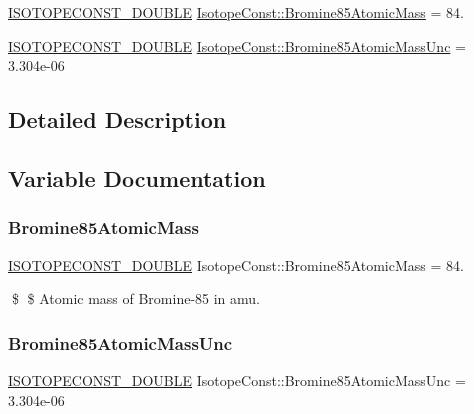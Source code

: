 \begin{DoxyCompactItemize}
\item 
\mbox{\hyperlink{group___isotope_const-_macros_ga8f45a7272ce02c0b4c65c44636ed719a}{I\+S\+O\+T\+O\+P\+E\+C\+O\+N\+S\+T\+\_\+\+D\+O\+U\+B\+LE}} \mbox{\hyperlink{group___isotope_const-_bromine-_br85_ga13665c09d7b5d3654af1a1f1cb1e62c3}{Isotope\+Const\+::\+Bromine85\+Atomic\+Mass}} = 84.
\item 
\mbox{\hyperlink{group___isotope_const-_macros_ga8f45a7272ce02c0b4c65c44636ed719a}{I\+S\+O\+T\+O\+P\+E\+C\+O\+N\+S\+T\+\_\+\+D\+O\+U\+B\+LE}} \mbox{\hyperlink{group___isotope_const-_bromine-_br85_ga22c033e37fce586beb32d6b892266d44}{Isotope\+Const\+::\+Bromine85\+Atomic\+Mass\+Unc}} = 3.\+304e-\/06
\end{DoxyCompactItemize}


\subsection{Detailed Description}


\subsection{Variable Documentation}
\mbox{\label{group___isotope_const-_bromine-_br85_ga13665c09d7b5d3654af1a1f1cb1e62c3}} 
\subsubsection{\texorpdfstring{Bromine85\+Atomic\+Mass}{Bromine85AtomicMass}}
{\footnotesize\ttfamily \mbox{\hyperlink{group___isotope_const-_macros_ga8f45a7272ce02c0b4c65c44636ed719a}{I\+S\+O\+T\+O\+P\+E\+C\+O\+N\+S\+T\+\_\+\+D\+O\+U\+B\+LE}} Isotope\+Const\+::\+Bromine85\+Atomic\+Mass = 84.}

\$ \$ Atomic mass of Bromine-\/85 in amu. \mbox{\label{group___isotope_const-_bromine-_br85_ga22c033e37fce586beb32d6b892266d44}} 
\subsubsection{\texorpdfstring{Bromine85\+Atomic\+Mass\+Unc}{Bromine85AtomicMassUnc}}
{\footnotesize\ttfamily \mbox{\hyperlink{group___isotope_const-_macros_ga8f45a7272ce02c0b4c65c44636ed719a}{I\+S\+O\+T\+O\+P\+E\+C\+O\+N\+S\+T\+\_\+\+D\+O\+U\+B\+LE}} Isotope\+Const\+::\+Bromine85\+Atomic\+Mass\+Unc = 3.\+304e-\/06}

